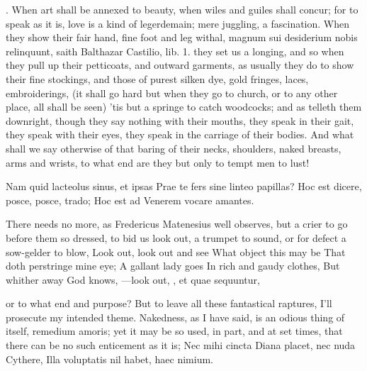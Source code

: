 . When art shall
be annexed to beauty, when wiles and guiles shall concur; for to speak
as it is, love is a kind of legerdemain; mere juggling, a fascination.
When they show their fair hand, fine foot and leg withal, magnum sui
desiderium nobis relinquunt, saith Balthazar Castilio, lib. 1.
they set us a longing, and so when they pull up their petticoats, and
outward garments, as usually they do to show their fine stockings, and
those of purest silken dye, gold fringes, laces, embroiderings, (it
shall go hard but when they go to church, or to any other place, all
shall be seen) 'tis but a springe to catch woodcocks; and as
\Chrysostom{} telleth them downright, though they say nothing with
their mouths, they speak in their gait, they speak with their eyes,
they speak in the carriage of their bodies. And what shall we say
otherwise of that baring of their necks, shoulders, naked breasts, arms
and wrists, to what end are they but only to tempt men to lust!

Nam quid lacteolus sinus, et ipsas
Prae te fers sine linteo papillas?
Hoc est dicere, posce, posce, trado;
Hoc est ad Venerem vocare amantes.

There needs no more, as Fredericus Matenesius well observes, but
a crier to go before them so dressed, to bid us look out, a trumpet to
sound, or for defect a sow-gelder to blow,
Look out, look out and see
What object this may be
That doth perstringe mine eye;
A gallant lady goes
In rich and gaudy clothes,
But whither away God knows,
---look out, \etc{}, et quae sequuntur,

or to what end and purpose? But to leave all these fantastical
raptures, I'll prosecute my intended theme. Nakedness, as I have said,
is an odious thing of itself, remedium amoris; yet it may be so used,
in part, and at set times, that there can be no such enticement as it
is;
Nec mihi cincta Diana placet, nec nuda Cythere,
Illa voluptatis nil habet, haec nimium.

